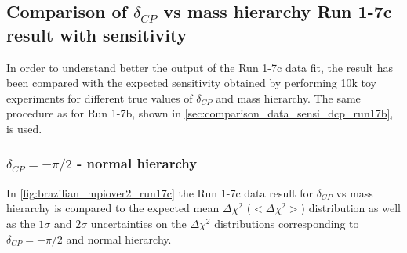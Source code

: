 
\clearpage





%
%

\subsection {Comparison of $\delta_{CP}$ vs mass hierarchy Run 1-7c result with sensitivity}
\label{sec:comparison_data_sensi_dcp_run17c}

In order to understand better the output of the Run 1-7c data fit, the result 
has been compared with the expected sensitivity obtained by performing 10k toy experiments
for different true values of $\delta_{CP}$ and mass hierarchy.
The same procedure as for Run 1-7b, shown in \cref{sec:comparison_data_sensi_dcp_run17b}, is used.

\subsubsection {$\delta_{CP} = -\pi/2$ - normal hierarchy}
\label{sec:dcp_mpiover2_nh_run17c}

In \cref{fig:brazilian_mpiover2_run17c} the Run 1-7c data result for $\delta_{CP}$ vs mass hierarchy 
is compared to the expected mean $\Delta \chi^2$ ($<\Delta \chi^2>$)
distribution as well as the $1\sigma$ and $2\sigma$ 
uncertainties on the $\Delta \chi^2$ distributions
corresponding to $\delta_{CP}=-\pi/2$ and normal hierarchy.

